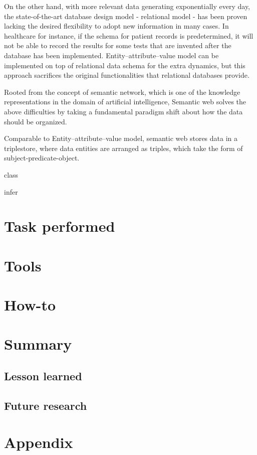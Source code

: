 \documentclass[12pt]{cls}
\begin{document}
On the other hand, with more relevant data generating exponentially every day, the state-of-the-art database design model - relational model - has been proven lacking the desired flexibility to adopt new information in many cases. In healthcare for instance, if the schema for patient records is predetermined, it will not be able to record the results for some tests that are invented after the database has been implemented. Entity–attribute–value model can be implemented on top of relational data schema for the extra dynamics, but this approach sacrifices the original functionalities that relational databases provide.

Rooted from the concept of semantic network, which is one of the knowledge representations in the domain of artificial intelligence, Semantic web solves the above difficulties by taking a fundamental paradigm shift about how the data should be organized.

Comparable to Entity–attribute–value model, semantic web stores data in a triplestore, where data entities are arranged as triples, which take the form of subject-predicate-object.

class

infer

\chapter{Task performed}
\chapter{Tools}
\chapter{How-to}

\chapter{Summary}
\section{Lesson learned}
\section{Future research}

\chapter{Appendix}
\end{document}

